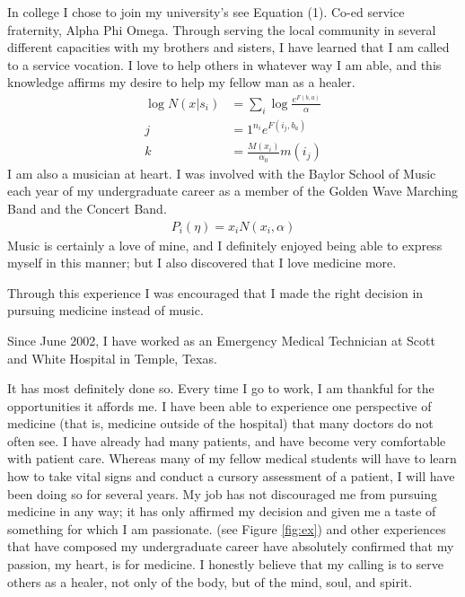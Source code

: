 \documentclass[manuscript]{clv2025}
\begin{document}
In college I chose to join my university's see Equation (1). Co-ed service fraternity, Alpha Phi Omega. Through serving the local community in several different capacities with my brothers and sisters, I have learned that I am called to a service vocation. I love to help others in whatever way I am able, and this knowledge affirms my desire to help my fellow man as a healer.
\begin{align}
\log N(x|s_i)&=\sum_i \log \frac{e^{F(b,a)}}{\alpha}\nonumber
\\
j&=1^{n_i}e^{F(i_j,b_a)}\nonumber
\\
k&=\frac{M(x_i)}{\alpha_0}m(i_j)\nonumber
\end{align}
I am also a musician at heart. I was involved with the Baylor School of Music each year of my undergraduate career as a member of the Golden Wave Marching Band and the Concert Band.
\begin{align}
P_i(\eta)=x_i N(x_i,\alpha)
\end{align}
Music is certainly a love of mine, and I definitely enjoyed being able to express myself
in this manner; but I also discovered that I love medicine more. 
\begin{algorithm}
\item[Step 1] Through this experience I was encouraged that I made the right decision in pursuing medicine instead of music.
\item[Step 2] Since June 2002, I have worked as an Emergency Medical Technician at Scott and White Hospital in Temple, Texas.
\end{algorithm}
It has most definitely done so. Every time I go to work, I am thankful for the opportunities it affords me. I have been able to experience one perspective of medicine (that is, medicine outside of the hospital) that many doctors do not often see. I have already had many patients, and have become very comfortable with patient care. Whereas many of my fellow medical students will have to learn how to take vital signs and conduct a cursory assessment of a patient, I will have been doing so for several years. My job has not discouraged me from pursuing medicine in any way; it has only affirmed my decision and given me a taste of something for which I am passionate. (see Figure \ref{fig:ex}) and other experiences that have composed my undergraduate career have absolutely confirmed that my passion, my heart, is for medicine. I honestly believe that my calling is to serve others as a healer, not only of the body, but of the mind, soul, and spirit.
\end{document}
